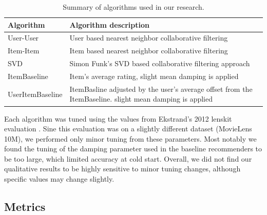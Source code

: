 \documentclass[letterpaper]{sig-alternate}
\begin{document}
  \begin{table}
    \centering
    \begin{tabular}{|p{6em}|p{18em}|}
      \hline
      Algorithm        & Algorithm description                                                                                     \\\hline
      User-User        & User based nearest neighbor collaborative filtering \cite{resnick1994grouplens}                           \\\hline
      Item-Item        & Item based nearest neighbor collaborative filtering \cite{sarwar2001item}                                 \\\hline
      SVD              & Simon Funk's SVD based collaborative filtering approach \cite{funk_netflix_2006}                          \\\hline
      ItemBaseline     & Item's average rating, slight mean damping is applied                                                     \\\hline
      UserItem\-Baseline & ItemBasline adjusted by the user's average offset from the ItemBaseline. slight mean damping is applied \\\hline
    \end{tabular}
    \caption{Summary of algorithms used in our research.}
    \label{tbl:algo}
  \end{table}


  Each algorithm was tuned using the values from Ekstrand's 2012 lenskit evaluation \cite{ekstrand2012recommenders}.
  Sine this evaluation was on a slightly different dataset (MovieLens 10M), we performed only minor tuning from these parameters.
  Most notably we found the tuning of the damping parameter used in the baseline recommenders to be too large, which limited accuracy at cold start.
  Overall, we did not find our qualitative results to be highly sensitive to minor tuning changes, although specific values may change slightly.
  

  \subsection*{Metrics}
  
  
  
  

\end{document}
